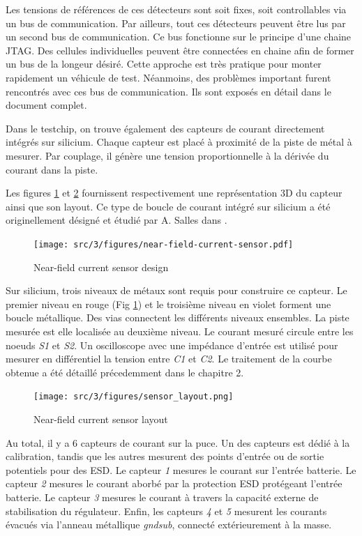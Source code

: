 Les tensions de références de ces détecteurs sont soit fixes, soit controllables via un bus de communication.
Par ailleurs, tout ces détecteurs peuvent être lus par un second bus de communication.
Ce bus fonctionne sur le principe d'une chaine JTAG.
Des cellules individuelles peuvent être connectées en chaine afin de former un bus de la longeur désiré.
Cette approche est très pratique pour monter rapidement un véhicule de test.
Néanmoins, des problèmes important furent rencontrés avec ces bus de communication.
Ils sont exposés en détail dans le document complet.

Dans le testchip, on trouve également des capteurs de courant directement intégrés sur silicium.
Chaque capteur est placé à proximité de la piste de métal à mesurer.
Par couplage, il génère une tension proportionnelle à la dérivée du courant dans la piste.

Les figures \ref{fig:near-field-current-sensor} et \ref{fig:near-field-current-sensor-layout} fournissent respectivement une représentation 3D du capteur ainsi que son layout.
Ce type de boucle de courant intégré sur silicium a été originellement désigné et étudié par A. Salles dans \cite{AlainSallesInductors}.

\begin{figure}[!h]
  \centering
  \texttt{[image: src/3/figures/near-field-current-sensor.pdf]}
  \caption{Near-field current sensor design}
  \label{fig:near-field-current-sensor}
\end{figure}

Sur silicium, trois niveaux de métaux sont requis pour construire ce capteur.
Le premier niveau en rouge (Fig \ref{fig:near-field-current-sensor}) et le troisième niveau en violet forment une boucle métallique.
Des vias connectent les différents niveaux ensembles.
La piste mesurée est elle localisée au deuxième niveau.
Le courant mesuré circule entre les noeuds \textit{S1} et \textit{S2}.
Un oscilloscope avec une impédance d'entrée \textOmega{} est utilisé pour mesurer en différentiel la tension entre \textit{C1} et \textit{C2}.
Le traitement de la courbe obtenue a été détaillé précedemment dans le chapitre 2.

\begin{figure}[!h]
  \centering
  \texttt{[image: src/3/figures/sensor\_layout.png]}
  \caption{Near-field current sensor layout}
  \label{fig:near-field-current-sensor-layout}
\end{figure}

Au total, il y a 6 capteurs de courant sur la puce.
Un des capteurs est dédié à la calibration, tandis que les autres mesurent des points d'entrée ou de sortie potentiels pour des ESD.
Le capteur \textit{1} mesures le courant sur l'entrée batterie.
Le capteur \textit{2} mesures le courant aborbé par la protection ESD protégeant l'entrée batterie.
Le capteur \textit{3} mesures le courant à travers la capacité externe de stabilisation du régulateur.
Enfin, les capteurs \textit{4} et \textit{5} mesurent les courants évacués via l'anneau métallique \textit{gndsub}, connecté extérieurement à la masse.
